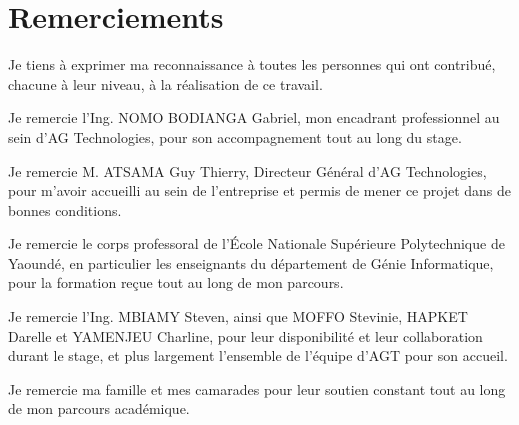 \chapter*{Remerciements}

Je tiens à exprimer ma reconnaissance à toutes les personnes qui ont
contribué, chacune à leur niveau, à la réalisation de ce travail.

Je remercie l'Ing. NOMO BODIANGA Gabriel, mon encadrant professionnel
au sein d'AG Technologies, pour son accompagnement tout au long du
stage.

Je remercie M. ATSAMA Guy Thierry, Directeur Général d'AG
Technologies, pour m'avoir accueilli au sein de l'entreprise et permis
de mener ce projet dans de bonnes conditions.

Je remercie le corps professoral de l'École Nationale Supérieure
Polytechnique de Yaoundé, en particulier les enseignants du
département de Génie Informatique, pour la formation reçue tout au
long de mon parcours.

Je remercie l'Ing. MBIAMY Steven, ainsi que MOFFO Stevinie, HAPKET
Darelle et YAMENJEU Charline, pour leur disponibilité et leur
collaboration durant le stage, et plus largement l'ensemble de
l'équipe d'AGT pour son accueil.

Je remercie ma famille et mes camarades pour leur soutien
constant tout au long de mon parcours académique.